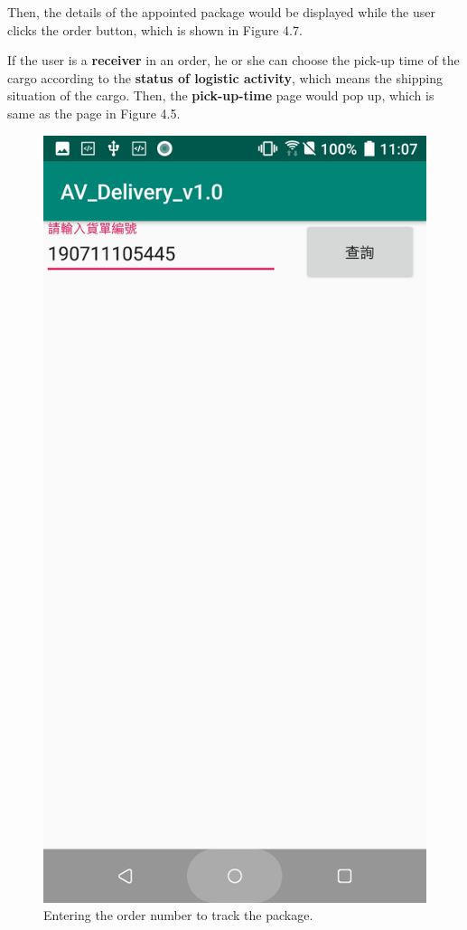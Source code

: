 \documentclass[12pt]{ksthesis}
\begin{document}
\begin{thesis}
{Then, the details of the appointed package would be displayed while the user clicks the order button, which is shown in Figure 4.7. 

If the user is a \textbf{receiver} in an order, he or she can choose the pick-up time of the cargo according to the \textbf{status of logistic activity}, which means the shipping situation of the cargo. Then, the \textbf{pick-up-time} page would pop up, which is same as the page in Figure 4.5. 

\begin{figure}[H]
\centering
\includegraphics[scale=0.125]{./figures/F4-8-ExamineOrders.PNG}
\caption{\large Entering the order number to track the package.}
\vspace{0.5cm}
\label{Fig:ExamineOrders}
\end{figure} 


}
\end{thesis}
\end{document}
